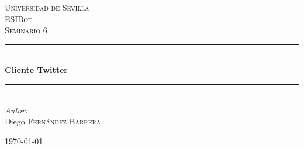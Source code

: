 \documentclass{article} %
\begin{document}

\begin{titlepage}

\newcommand{\HRule}{\rule{\linewidth}{0.5mm}} %

\center %

\textsc{\LARGE Universidad de Sevilla}\\[1.5cm] %
\textsc{\Large ESIBot}\\[0.5cm] %
\textsc{\large Seminario 6}\\[0.5cm] %

\HRule \\[0.4cm]
{ \huge \bfseries Cliente Twitter}\\[0.4cm] %
\HRule \\[1.5cm]


\large
\emph{Autor:}\\

Diego \textsc{Fernández Barrera}

\hspace{3cm}

{\large \today}\\ %

\vfill %

\end{titlepage}



\end{document}
